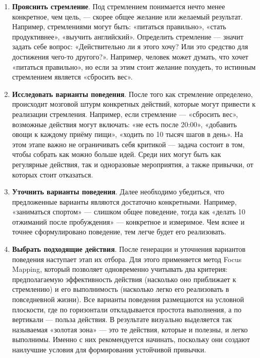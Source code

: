 \documentclass[pdflatex,sn-mathphys-num]{sn-jnl}%
\theoremstyle{thmstyleone}%
\theoremstyle{thmstyletwo}%
\theoremstyle{thmstylethree}%
\begin{document}
\begin{enumerate}
    \item \label{th:aspiration} \textbf{Прояснить стремление}. Под стремлением понимается нечто менее конкретное, чем цель, — скорее общее желание или желаемый результат. Например, стремлениями могут быть: «питаться правильно», «стать продуктивнее», «выучить английский». Определить стремление — значит задать себе вопрос: «Действительно ли я этого хочу? Или это средство для достижения чего-то другого?». Например, человек может думать, что хочет «питаться правильно», но если за этим стоит желание похудеть, то истинным стремлением является «сбросить вес».
    \item \label{th:beh_explore} \textbf{Исследовать варианты поведения}. После того как стремление определено, происходит мозговой штурм конкретных действий, которые могут привести к реализации стремления.  Например, если стремление — «сбросить вес», возможные действия могут включать: «не есть после 20:00», «добавить овощи к каждому приёму пищи», «ходить по 10 тысяч шагов в день». На этом этапе важно не ограничивать себя критикой — задача состоит в том, чтобы собрать как можно больше идей. Среди них могут быть как регулярные действия, так и одноразовые мероприятия, а также привычки, от которых стоит отказаться.
    \item \label{th:beh_crispify} \textbf{Уточнить варианты поведения}.  Далее необходимо убедиться, что предложенные варианты являются достаточно конкретными. Например, «заниматься спортом» — слишком общее поведение, тогда как «делать 10 отжиманий после пробуждения» — конкретное и измеримое. Чем яснее и точнее сформулировано поведение, тем легче будет его реализовать.
    \item \label{th:beh_eval} \textbf{Выбрать подходящие действия}. После генерации и уточнения вариантов поведения наступает этап их отбора. Для этого применяется метод Focus Mapping, который позволяет одновременно учитывать два критерия: предполагаемую эффективность действия (насколько оно приближает к стремлению) и его выполнимость (насколько легко его реализовать в повседневной жизни). Все варианты поведения размещаются на условной плоскости, где по горизонтали откладывается простота выполнения, а по вертикали — польза действия. В результате визуально выделяется так называемая «золотая зона» — это те действия, которые и полезны, и легко выполнимы. Именно с них рекомендуется начинать, поскольку они создают наилучшие условия для формирования устойчивой привычки.

\end{enumerate}
\end{document}
